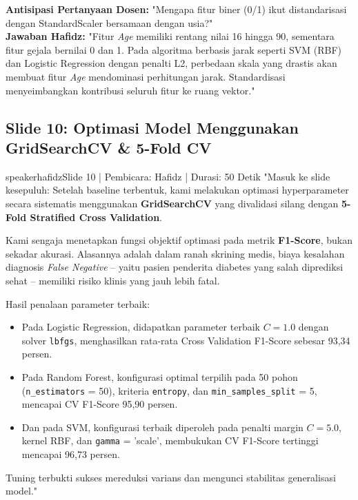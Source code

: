 \documentclass[11pt,a4paper]{article}
\begin{document}
\begin{defensebox}
\textbf{Antisipasi Pertanyaan Dosen:} "Mengapa fitur biner (0/1) ikut distandarisasi dengan StandardScaler bersamaan dengan usia?"\\
\textbf{Jawaban Hafidz:} "Fitur \textit{Age} memiliki rentang nilai 16 hingga 90, sementara fitur gejala bernilai 0 dan 1. Pada algoritma berbasis jarak seperti SVM (RBF) dan Logistic Regression dengan penalti L2, perbedaan skala yang drastis akan membuat fitur \textit{Age} mendominasi perhitungan jarak. Standardisasi menyeimbangkan kontribusi seluruh fitur ke ruang vektor."
\end{defensebox}

\subsection{Slide 10: Optimasi Model Menggunakan GridSearchCV \& 5-Fold CV}
\begin{scriptbox}{speakerhafidz}{Slide 10 | Pembicara: Hafidz | Durasi: 50 Detik}
"Masuk ke slide kesepuluh: Setelah baseline terbentuk, kami melakukan optimasi hyperparameter secara sistematis menggunakan \textbf{GridSearchCV} yang divalidasi silang dengan \textbf{5-Fold Stratified Cross Validation}.

Kami sengaja menetapkan fungsi objektif optimasi pada metrik \textbf{F1-Score}, bukan sekadar akurasi. Alasannya adalah dalam ranah skrining medis, biaya kesalahan diagnosis \textit{False Negative} -- yaitu pasien penderita diabetes yang salah diprediksi sehat -- memiliki risiko klinis yang jauh lebih fatal.

Hasil penalaan parameter terbaik:
\begin{itemize}[leftmargin=*,itemsep=1pt]
    \item Pada Logistic Regression, didapatkan parameter terbaik $C = 1.0$ dengan solver \texttt{lbfgs}, menghasilkan rata-rata Cross Validation F1-Score sebesar 93,34 persen.
    \item Pada Random Forest, konfigurasi optimal terpilih pada 50 pohon (\texttt{n\_estimators} = 50), kriteria \texttt{entropy}, dan \texttt{min\_samples\_split} = 5, mencapai CV F1-Score 95,90 persen.
    \item Dan pada SVM, konfigurasi terbaik diperoleh pada penalti margin $C = 5.0$, kernel RBF, dan \texttt{gamma} = 'scale', membukukan CV F1-Score tertinggi mencapai 96,73 persen.
\end{itemize}
Tuning terbukti sukses mereduksi varians dan mengunci stabilitas generalisasi model."
\end{scriptbox}
\end{document}
